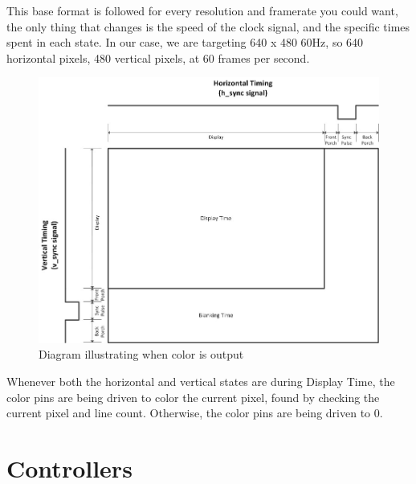 \documentclass[]{article}
\begin{document}
This base format is followed for every resolution and framerate you could want, the only thing that changes is the speed of the clock signal, and the specific times spent in each state.  In our case, we are targeting 640 x 480 60Hz, so 640 horizontal pixels, 480 vertical pixels, at 60 frames per second.
\begin{figure}[H]\centering
    \includegraphics[width=0.75\linewidth]{figures/VGA_Frame_Diagram.jpg}
    \caption{Diagram illustrating when color is output \cite{vgaFrameDiagram}} 
    \label{fig:vgaFrameFigure}
\end{figure}
Whenever both the horizontal and vertical states are during Display Time, the color pins are being driven to color the current pixel, found by checking the current pixel and line count.  Otherwise, the color pins are being driven to 0.

\section{Controllers}
\end{document}
